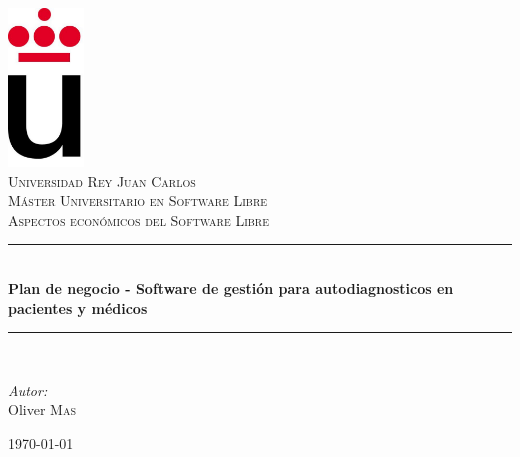 \documentclass[11pt]{article}
\newcommand{\HRule}{\rule{\linewidth}{0.5mm}}
\begin{document}
\begin{titlepage}

\begin{center}


\includegraphics[width=0.15\textwidth]{./logo}\\[1cm]    

\textsc{\LARGE Universidad Rey Juan Carlos}\\[1.5cm]
\textsc{\Large Máster Universitario en Software Libre}\\[0.2cm]
\textsc{Aspectos económicos del Software Libre}\\[0.2cm]

\HRule \\[0.4cm]
{ \huge \bfseries Plan de negocio - Software de gestión para autodiagnosticos en pacientes y médicos}\\[0.4cm]
\HRule \\[1.5cm]

\begin{minipage}{1\textwidth}
\begin{flushleft} \large
\emph{Autor:}\\
Oliver \textsc{Mas}
\end{flushleft}
\end{minipage}

\vfill

{\large \today}

\end{center}

\end{titlepage}



\tableofcontents
\newpage
\end{document}
